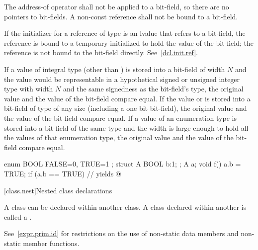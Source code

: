 \pnum
{}%
The address-of operator \tcode{\&} shall not be applied to a bit-field,
so there are no pointers to bit-fields.
%
%
%
A non-const reference shall not be bound to a
bit-field.
\begin{note}
If the initializer for a reference of type   is
an lvalue that refers to a bit-field, the reference is bound to a
temporary initialized to hold the value of the bit-field; the reference
is not bound to the bit-field directly. See~\ref{dcl.init.ref}.
\end{note}

\pnum
If a value of integral type (other than ) is stored
into a bit-field of width $N$ and the value would be representable
in a hypothetical signed or unsigned integer type
with width $N$ and the same signedness as the bit-field's type,
the original value and the value of the bit-field compare equal.
If the value  or  is stored into a bit-field of
type  of any size (including a one bit bit-field), the
original  value and the value of the bit-field compare
equal. If a value of an enumeration type is stored into a bit-field of the
same type and the width is large
enough to hold all the values of that enumeration type,
the original value and the value of the bit-field compare equal.
\begin{example}
\begin{codeblock}
enum BOOL { FALSE=0, TRUE=1 };
struct A {
  BOOL b:1;
};
A a;
void f() {
  a.b = TRUE;
  if (a.b == TRUE)              // yields 
    { @\commentellip@ }
}
\end{codeblock}
\end{example}

[class.nest]{Nested class declarations}%
%

\pnum
A class can be declared within another class. A class declared within
another is called a .
\begin{note}
See~\ref{expr.prim.id} for restrictions on the use of non-static data
members and non-static member functions.
\end{note}

